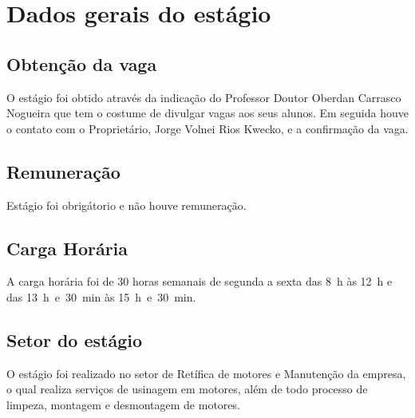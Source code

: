\chapter{Dados gerais do estágio}\label{ch:dados}

\section{Obtenção da vaga}\label{sec:obtencao}

O estágio foi obtido através da indicação do Professor Doutor Oberdan Carrasco Nogueira 
que tem o costume de divulgar vagas aos seus alunos. Em seguida houve o contato com o Proprietário, 
Jorge Volnei Rios Kwecko, e a confirmação da vaga.

\section{Remuneração}\label{sec:remuneracao}

Estágio foi obrigátorio e não houve remuneração.

\section{Carga Horária}\label{sec:cargahoraria}

A carga horária foi de 30 horas semanais de segunda a sexta das 8~h às 12~h e das 13~h~e~30~min às 15~h~e~30~min.

\section{Setor do estágio}\label{sec:setorestagio}

O estágio foi realizado no setor de Retífica de motores e Manutenção da
empresa, o qual realiza serviços de usinagem em motores, além de todo processo de limpeza, 
montagem e desmontagem de motores.
